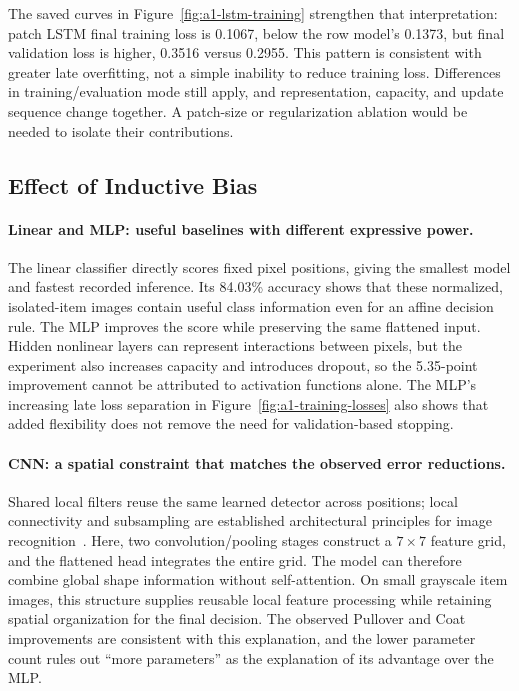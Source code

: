 The saved curves in Figure~\ref{fig:a1-lstm-training} strengthen that interpretation: patch LSTM final training loss is 0.1067, below the row model's 0.1373, but final validation loss is higher, 0.3516 versus 0.2955. This pattern is consistent with greater late overfitting, not a simple inability to reduce training loss. Differences in training/evaluation mode still apply, and representation, capacity, and update sequence change together. A patch-size or regularization ablation would be needed to isolate their contributions.

\subsection{Effect of Inductive Bias}

\paragraph{Linear and MLP: useful baselines with different expressive power.}
The linear classifier directly scores fixed pixel positions, giving the smallest model and fastest recorded inference. Its 84.03\% accuracy shows that these normalized, isolated-item images contain useful class information even for an affine decision rule. The MLP improves the score while preserving the same flattened input. Hidden nonlinear layers can represent interactions between pixels, but the experiment also increases capacity and introduces dropout, so the 5.35-point improvement cannot be attributed to activation functions alone. The MLP's increasing late loss separation in Figure~\ref{fig:a1-training-losses} also shows that added flexibility does not remove the need for validation-based stopping.

\paragraph{CNN: a spatial constraint that matches the observed error reductions.}
Shared local filters reuse the same learned detector across positions; local connectivity and subsampling are established architectural principles for image recognition~\cite{lecun1998gradient}. Here, two convolution/pooling stages construct a $7\times7$ feature grid, and the flattened head integrates the entire grid. The model can therefore combine global shape information without self-attention. On small grayscale item images, this structure supplies reusable local feature processing while retaining spatial organization for the final decision. The observed Pullover and Coat improvements are consistent with this explanation, and the lower parameter count rules out ``more parameters'' as the explanation of its advantage over the MLP.

